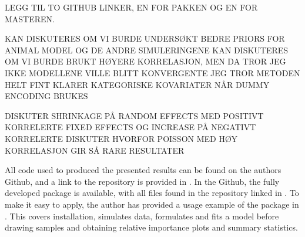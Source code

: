 LEGG TIL TO GITHUB LINKER, EN FOR PAKKEN OG EN FOR MASTEREN.

KAN DISKUTERES OM VI BURDE UNDERSØKT BEDRE PRIORS FOR ANIMAL MODEL OG DE ANDRE SIMULERINGENE
KAN DISKUTERES OM VI BURDE BRUKT HØYERE KORRELASJON, MEN DA TROR JEG IKKE MODELLENE VILLE BLITT KONVERGENTE
JEG TROR METODEN HELT FINT KLARER KATEGORISKE KOVARIATER NÅR DUMMY ENCODING BRUKES

DISKUTER SHRINKAGE PÅ RANDOM EFFECTS MED POSITIVT KORRELERTE FIXED EFFECTS OG INCREASE PÅ NEGATIVT KORRELERTE
DISKUTER HVORFOR POISSON MED HØY KORRELASJON GIR SÅ RARE RESULTATER

All code used to produced the presented results can be found on the authors Github, and a link to the repository is provided in . In the Github, the fully developed package is available, with all files found in the repository linked in . To make it easy to apply, the author has provided a usage example of the package in . This covers installation, simulates data, formulates and fits a model before drawing samples and obtaining relative importance plots and summary statistics. 

